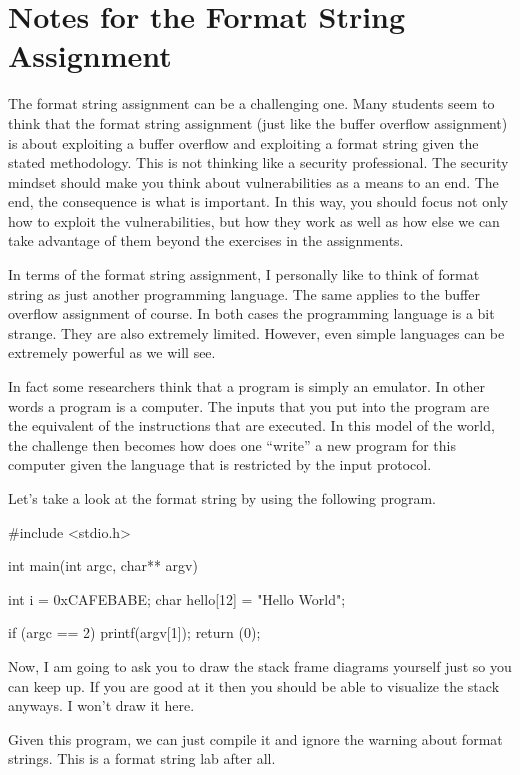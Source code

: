 \chapter{Notes for the Format String Assignment}
 
The format string assignment can be a challenging one. Many students seem to think that the format string assignment (just like the buffer overflow assignment) is about exploiting a buffer overflow and exploiting a format string given the stated methodology. This is not thinking like a security professional.  
The security mindset should make you think about vulnerabilities as a means to an end. The end, the consequence is what is important. In this way, you should focus not only how to exploit the vulnerabilities, but how they work as well as how else we can take advantage of them beyond the exercises in the assignments.  
 
In terms of the format string assignment, I personally like to think of format string as just another programming language. The same applies to the buffer overflow assignment of course. In both cases the programming language is a bit strange. They are also extremely limited. However, even simple languages can be extremely powerful as we will see. 
 
In fact some researchers think that a program is simply an emulator. In other words a program is a computer. The inputs that you put into the program are the equivalent of the instructions that are executed. In this model of the world, the challenge then becomes how does one ``write'' a new program for this computer given the language that is restricted by the input protocol. 
 
Let’s take a look at the format string by using the following program. 

\begin{code} 
#include <stdio.h> 
 
int main(int argc, char** argv) 
{
  int i = 0xCAFEBABE;
  char hello[12] = "Hello World\n"; 
 
  if (argc == 2)
  {
    printf(argv[1]);
  }   
  return (0); 
} 
\end{code}
 
Now, I am going to ask you to draw the stack frame diagrams yourself just so you can keep up. If you are good at it then you should be able to visualize the stack anyways. I won’t draw it here. 
 
Given this program, we can just compile it and ignore the warning about format strings. This is a format string lab after all. 
 
